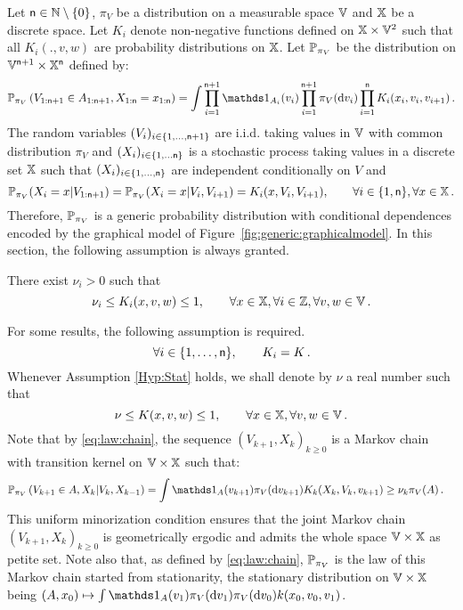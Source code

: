 Let ${\mathsf n}\in\mathbb{N}\setminus\{0\}$, $\pi_V$ be a distribution on a measurable space $\mathbb{V}$ and $\mathbb{X}$ be a discrete space. Let $K_i$ denote non-negative functions defined on $\mathbb{X}\times\mathbb{V}^2$ such that all $K_i(.,v,w)$ are probability distributions on $\mathbb{X}$. Let $\mathbb{P}_{\pi_V}$ be the distribution on $\mathbb{V}^{{\mathsf n}+1}\times\mathbb{X}^{{\mathsf n}}$ defined by: 
\begin{equation}
\label{eq:law:chain}
\bP_{\pi_V}\pa{V_{1:\nobs+1}\in A_{1:\nobs+1},X_{1:\nobs}=x_{1:\nobs}}
=\int\prod_{i=1}^{\nobs+1}\un{A_i}(v_i)\prod_{i=1}^{\nobs+1}\pi_V(\rmd v_i)\prod_{i=1}^{\nobs}K_i(x_i,v_i,v_{i+1})\eqsp.
\end{equation}
The random variables $(V_i)_{i\in \{1,\ldots,{\mathsf n}+1\}}$ are i.i.d. taking values in $\mathbb{V}$ with common distribution $\pi_V$ and $(X_i)_{i\in \{1,\ldots{\mathsf n}\}}$ is a stochastic process taking values in a discrete set $\mathbb{X}$ such that $(X_i)_{i\in \{1,\ldots,{\mathsf n}\}}$ are independent conditionally on $V$ and
\[
\mathbb{P}_{\pi_V}(X_i=x|V_{1:{\mathsf n}+1})=\mathbb{P}_{\pi_V}(X_i=x|V_{i},V_{i+1}) =K_i(x,V_{i},V_{i+1}),\qquad \forall i\in \{1,{\mathsf n}\},\forall x\in \mathbb{X}\,.
\]
Therefore, $\mathbb{P}_{\pi_V}$ is a generic probability distribution with conditional dependences encoded by the graphical model of Figure~\ref{fig:generic:graphicalmodel}. In this section, the following assumption is always granted.
\begin{hypH}
\label{assum:min}
There exist $\nu_i>0$ such that
\begin{equation}\label{Hyp:MinK_i}
\nu_i\le K_i(x,v,w)\le 1,\qquad \forall x\in\Xset,\forall i\in\bZ,\forall v,w\in\Vset\eqsp. 
\end{equation}
\end{hypH}
%
For some results, the following assumption is required.
\begin{equation}\label{Hyp:Stat}
\forall i\in\{1,\ldots,\nobs\},\qquad K_i=K\eqsp. 
\end{equation}
Whenever Assumption \eqref{Hyp:Stat} holds, we shall denote by $\nu$ a real number such that 
\begin{equation*}
\nu\le K(x,v,w)\le 1,\qquad \forall x\in\Xset,\forall v,w\in\Vset\eqsp. 
\end{equation*}
Note that by \eqref{eq:law:chain}, the sequence $(V_{k+1},X_{k})_{k\ge 0}$ is a Markov chain with transition kernel on $\mathbb{V}\times\mathbb{X}$ such that: 
\begin{align*}
\bP_{\pi_V}\pa{V_{k+1}\in A,X_k\middle|V_{k},X_{k-1}}&=\int\un{A}(v_{k+1})\pi_V(\rmd v_{k+1})K_k(X_k,V_k,v_{k+1})\ge \nu_k \pi_V(A)\eqsp.
\end{align*}
This uniform minorization condition ensures that the joint Markov chain $(V_{k+1},X_{k})_{k\ge 0}$ is geometrically ergodic and admits the whole space $\mathbb{V}\times\mathbb{X}$ as petite set. Note also that, as defined by \eqref{eq:law:chain}, $\mathbb{P}_{\pi_V}$ is the law of this Markov chain started from stationarity, the stationary distribution on $\mathbb{V}\times\mathbb{X}$ being $(A,x_0)\mapsto \int \un{A}(v_1)\pi_V(\rmd v_1) \pi_V(\rmd v_0)\condlik(x_0,v_0,v_1)$.


